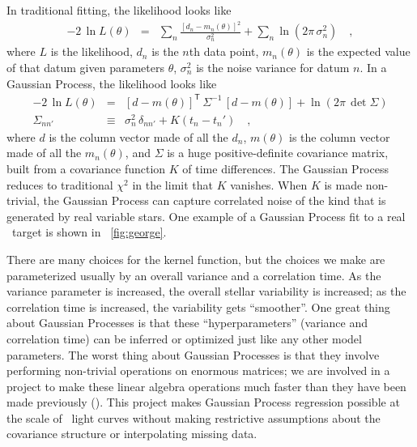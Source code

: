 \documentclass[letterpaper,12pt,preprint]{hack_aastex}
\newcommand{\transpose}[1]{{#1}^{\!\mathsf{T}}}
\newcommand{\inverse}[1]{{#1}^{-1}}
\begin{document}
In traditional fitting, the likelihood looks like
\begin{eqnarray}
-2\,\ln L(\theta) &=& \sum_n \frac{[d_n - m_n(\theta)]^2}{\sigma_n^2} + \sum_n \ln (2\pi\,\sigma_n^2)
\quad ,
\end{eqnarray}
where $L$ is the likelihood,
$d_n$ is the $n$th data point,
$m_n(\theta)$ is the expected value of that datum given parameters $\theta$,
$\sigma_n^2$ is the noise variance for datum $n$.
In a Gaussian Process, the likelihood looks like
\begin{eqnarray}
-2\,\ln L(\theta) &=& \transpose{[d - m(\theta)]}\,\inverse{\Sigma}\,[d - m(\theta)] + \ln (2\pi\,\det{\Sigma})
\\
\Sigma_{nn'} &\equiv& \sigma_n^2\,\delta_{nn'} + K(t_n - t_n')
\quad ,
\end{eqnarray}
where $d$ is the column vector made of all the $d_n$,
$m(\theta)$ is the column vector made of all the $m_n(\theta)$,
and $\Sigma$ is a huge positive-definite covariance matrix,
built from a covariance function $K$ of time differences.
The Gaussian Process reduces to traditional $\chi^2$ in the limit that $K$
vanishes.
When $K$ is made non-trivial, the Gaussian Process can capture correlated
noise of the kind that is generated by real variable stars.
One example of a Gaussian Process fit to a real \Kepler\ target is shown in
\figurename~\ref{fig:george}.


There are many choices for the kernel function, but the choices we make are
parameterized usually by an overall variance and a correlation time.
As the variance parameter is increased, the overall stellar variability is
increased; as the correlation time is increased, the variability gets
``smoother''.
One great thing about Gaussian Processes is that these ``hyperparameters''
(variance and correlation time) can be inferred or optimized just like
any other model parameters.
The worst thing about Gaussian Processes is that they involve performing
non-trivial operations on enormous matrices;
we are involved in a project to make these linear algebra operations much
faster than they have been made previously (\citealt{fastgp}).
This project makes Gaussian Process regression possible at the scale of
\Kepler\ light curves without making restrictive assumptions about the
covariance structure or interpolating missing data.
\end{document}
